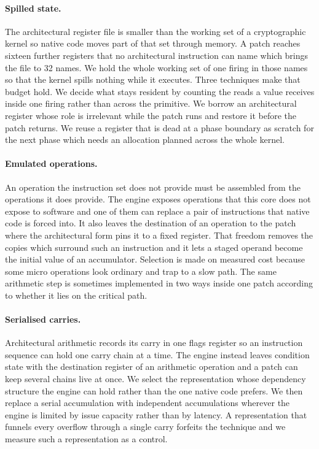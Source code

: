 \paragraph{Spilled state.}
The architectural register file is smaller than the working set of a cryptographic kernel so native code moves part of that set through memory.
A patch reaches sixteen further registers that no architectural instruction can name which brings the file to 32 names.
We hold the whole working set of one firing in those names so that the kernel spills nothing while it executes.
Three techniques make that budget hold.
We decide what stays resident by counting the reads a value receives inside one firing rather than across the primitive.
We borrow an architectural register whose role is irrelevant while the patch runs and restore it before the patch returns.
We reuse a register that is dead at a phase boundary as scratch for the next phase which needs an allocation planned across the whole kernel.

\paragraph{Emulated operations.}
An operation the instruction set does not provide must be assembled from the operations it does provide.
The engine exposes operations that this core does not expose to software and one of them can replace a pair of instructions that native code is forced into.
It also leaves the destination of an operation to the patch where the architectural form pins it to a fixed register.
That freedom removes the copies which surround such an instruction and it lets a staged operand become the initial value of an accumulator.
Selection is made on measured cost because some micro operations look ordinary and trap to a slow path.
The same arithmetic step is sometimes implemented in two ways inside one patch according to whether it lies on the critical path.

\paragraph{Serialised carries.}
Architectural arithmetic records its carry in one flags register so an instruction sequence can hold one carry chain at a time.
The engine instead leaves condition state with the destination register of an arithmetic operation and a patch can keep several chains live at once.
We select the representation whose dependency structure the engine can hold rather than the one native code prefers.
We then replace a serial accumulation with independent accumulations wherever the engine is limited by issue capacity rather than by latency.
A representation that funnels every overflow through a single carry forfeits the technique and we measure such a representation as a control.

